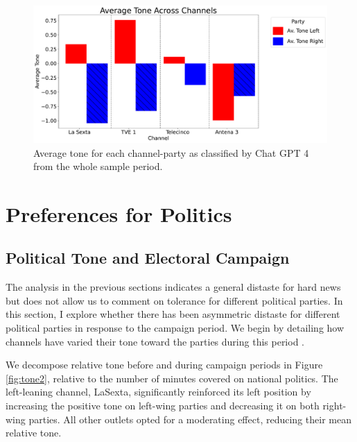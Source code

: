 \documentclass[12pt]{article}
\begin{document}
	
	\begin{figure}[h!]
		\centering
		\includegraphics[width=160mm]{figures/chatgpt}
		\caption{Average tone for each channel-party as classified by Chat GPT 4 from the whole sample period. }
		\label{fig:chat}
	\end{figure}
	
	
	
	
	\section{Preferences for Politics}\label{section:politics}
	
	\subsection{Political Tone and Electoral Campaign}
	
	The analysis in the previous sections indicates a general distaste for hard news but does not allow us to comment on tolerance for different political parties. In this section, I explore whether there has been asymmetric distaste for different political parties in response to the campaign period. We begin by detailing how channels have varied their tone toward the parties during this period \citep{independent2023vox}.
	
	We decompose relative tone before and during campaign periods in Figure \ref{fig:tone2}, relative to the number of minutes covered on national politics. The left-leaning channel, LaSexta, significantly reinforced its left position by increasing the positive tone on left-wing parties and decreasing it on both right-wing parties. All other outlets opted for a moderating effect, reducing their mean relative tone.
	
\end{document}
